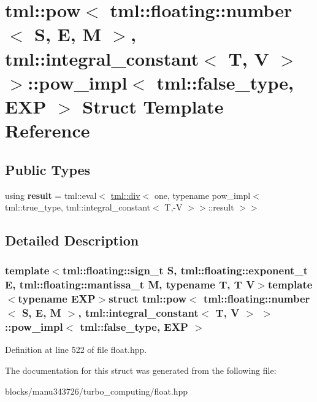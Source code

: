 \hypertarget{structtml_1_1pow_3_01tml_1_1floating_1_1number_3_01_s_00_01_e_00_01_m_01_4_00_01tml_1_1integral_4a210a0605b90a001e8ae02fa541b57f}{\section{tml\+:\+:pow$<$ tml\+:\+:floating\+:\+:number$<$ S, E, M $>$, tml\+:\+:integral\+\_\+constant$<$ T, V $>$ $>$\+:\+:pow\+\_\+impl$<$ tml\+:\+:false\+\_\+type, E\+X\+P $>$ Struct Template Reference}
\label{structtml_1_1pow_3_01tml_1_1floating_1_1number_3_01_s_00_01_e_00_01_m_01_4_00_01tml_1_1integral_4a210a0605b90a001e8ae02fa541b57f}
}
\subsection*{Public Types}
\begin{DoxyCompactItemize}
\item 
\hypertarget{structtml_1_1pow_3_01tml_1_1floating_1_1number_3_01_s_00_01_e_00_01_m_01_4_00_01tml_1_1integral_4a210a0605b90a001e8ae02fa541b57f_afcabc1e846556a5df62e5da0d8cb51c2}{using {\bfseries result} = tml\+::eval$<$ \hyperlink{structtml_1_1div}{tml\+::div}$<$ one, typename pow\+\_\+impl$<$ tml\+::true\+\_\+type, tml\+::integral\+\_\+constant$<$ T,-\/V $>$$>$\+::result $>$$>$}\label{structtml_1_1pow_3_01tml_1_1floating_1_1number_3_01_s_00_01_e_00_01_m_01_4_00_01tml_1_1integral_4a210a0605b90a001e8ae02fa541b57f_afcabc1e846556a5df62e5da0d8cb51c2}

\end{DoxyCompactItemize}


\subsection{Detailed Description}
\subsubsection*{template$<$tml\+::floating\+::sign\+\_\+t S, tml\+::floating\+::exponent\+\_\+t E, tml\+::floating\+::mantissa\+\_\+t M, typename T, T V$>$template$<$typename E\+X\+P$>$struct tml\+::pow$<$ tml\+::floating\+::number$<$ S, E, M $>$, tml\+::integral\+\_\+constant$<$ T, V $>$ $>$\+::pow\+\_\+impl$<$ tml\+::false\+\_\+type, E\+X\+P $>$}



Definition at line 522 of file float.\+hpp.



The documentation for this struct was generated from the following file\+:\begin{DoxyCompactItemize}
\item 
blocks/manu343726/turbo\+\_\+computing/float.\+hpp\end{DoxyCompactItemize}
